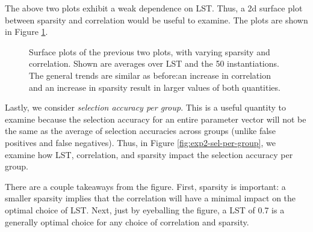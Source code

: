 \documentclass[11pt]{article}
\begin{document}
The above two plots exhibit a weak dependence on LST. Thus, a 2d surface plot between sparsity and correlation would be useful to examine. The plots are shown in Figure \ref{fig:exp2-mag-fn-surface}. 

\begin{figure}[H]
	\centering
	\caption{Surface plots of the previous two plots, with varying sparsity and correlation. Shown are averages over LST and the 50 instantiations. The general trends are similar as before:an increase in correlation and an increase in sparsity result in larger values of both quantities.}
	\label{fig:exp2-mag-fn-surface}
\end{figure}

Lastly, we consider \textit{selection accuracy per group}. This is a useful quantity to examine because the selection accuracy for an entire parameter vector will not be the same as the average of selection accuracies across groups (unlike false positives and false negatives). Thus, in Figure \ref{fig:exp2-sel-per-group}, we examine how LST, correlation, and sparsity impact the selection accuracy per group.  

There are a couple takeaways from the figure. First, sparsity is important: a smaller sparsity implies that the correlation will have a minimal impact on the optimal choice of LST. Next, just by eyeballing the figure, a LST of 0.7 is a generally optimal choice for any choice of correlation and sparsity. 
\end{document}
